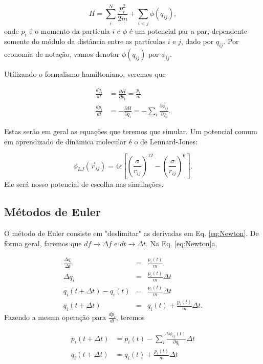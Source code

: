 \documentclass[twoside, a4paper]{article}
\newcommand{\phiij}{\phi_{ij}}
\newcommand{\del}[2]{\frac{\partial #1}{\partial #2}}
\newcommand{\deri}[2]{\frac{d #1}{d #2}}
\begin{document}
\begin{equation}
	H = \sum_i^N \frac{p_i^2}{2m} + \sum_{i<j} \phi(q_{ij}),
\end{equation}
onde $p_i$ é o momento da partícula $i$ e $\phi$ é um potencial par-a-par, dependente somente do módulo da distância entre as partículas $i$ e $j$, dado por $q_{ij}$. Por economia de notação, vamos denotar $\phi(q_{ij})$ por $\phiij$. 

Utilizando o formalismo hamiltoniano, veremos que 

\begin{subequations}
	\begin{align}
	\deri{q_i}{t} &=  \del{H}{p_i} = \frac{p_i}{m} \\
	\deri{p_i}{t} &= -\del{H}{q_i} = -\sum_i \del{\phiij}{q_i}.
	\end{align}
	\label{eq:Newton}
\end{subequations}

Estas serão em geral as equações que teremos que simular. Um potencial comum em aprendizado de dinâmica molecular é o de Lennard-Jones:

\begin{equation}
	\phi_{LJ}(\vec{r}_{ij}) = 4\epsilon\left[ \left(\frac{\sigma}{r_{ij}}\right)^{12} -  \left(\frac{\sigma}{r_{ij}}\right)^{6} \right].
\end{equation}
Ele será nosso potencial de escolha nas simulações.

\subsection{Métodos de Euler}

O método de Euler consiste em "deslimitar" as derivadas em Eq. \ref{eq:Newton}. De forma geral, faremos que $df \rightarrow \Delta f$ e  $dt \rightarrow \Delta t$. Na Eq. \ref{eq:Newton}a,

\begin{eqnarray*}
	\frac{\Delta q_i}{\Delta t} &=& \frac{p_i(t)}{m} \\
	\Delta q_i &=& \frac{p_i(t)}{m} \Delta t \\
	q_i(t+\Delta t) - q_i(t) &=& \frac{p_i(t)}{m} \Delta t \\
	q_i(t+\Delta t) &=& q_i(t) + \frac{p_i(t)}{m} \Delta t.
\end{eqnarray*}
Fazendo a mesma operação para $\deri{p_i}{t}$, teremos

\begin{subequations}
	\begin{align}
		p_i(t+\Delta t) &= p_i(t) -\sum_i \del{\phiij(t)}{q_i} \Delta t \\
		q_i(t+\Delta t) &= q_i(t) + \frac{p_i(t)}{m} \Delta t
	\end{align}
	\label{eq:Euler_Simples}
\end{subequations}
\end{document}
